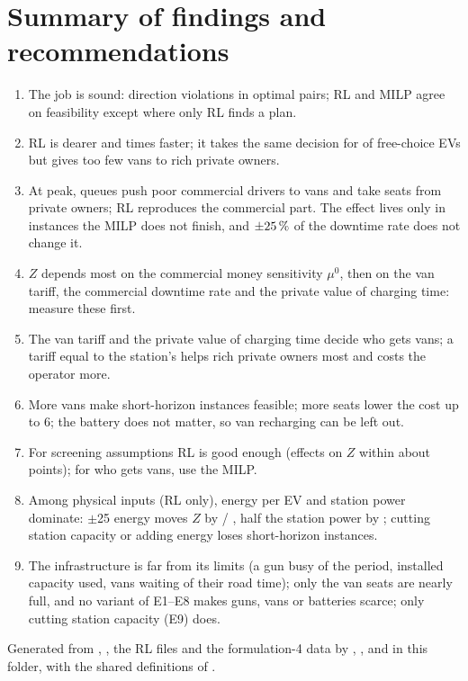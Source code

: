 \section{Summary of findings and recommendations}
\begin{enumerate}
  \item The job is sound: \DirBad{} direction violations in \DirPairs{} optimal pairs; RL and MILP agree on feasibility except where only RL finds a plan.
  \item RL is \GapMean\pct{} dearer and \SpeedUp{} times faster; it takes the same decision for \AgreeFree\pct{} of free-choice EVs but gives too few vans to rich private owners.
  \item At peak, queues push poor commercial drivers to vans and take seats from private owners; RL reproduces the commercial part. The effect lives only in instances the MILP does not finish, and $\pm25\,\%$ of the downtime rate does not change it.
  \item $Z$ depends most on the commercial money sensitivity $\mu^0$, then on the van tariff, the commercial downtime rate and the private value of charging time: measure these first.
  \item The van tariff and the private value of charging time decide who gets vans; a tariff equal to the station's helps rich private owners most and costs the operator more.
  \item More vans make short-horizon instances feasible; more seats lower the cost up to 6; the battery does not matter, so van recharging can be left out.
  \item For screening assumptions RL is good enough (effects on $Z$ within about \EffDiffRtMean{} points); for who gets vans, use the MILP.
  \item Among physical inputs (RL only), energy per EV and station power dominate: $\pm$25\pct{} energy moves $Z$ by \dZEtenDemLoRt\pct{} / \dZEtenDemHiRt\pct, half the station power by \dZEninePowLoRt\pct; cutting station capacity or adding energy loses short-horizon instances.
  \item The infrastructure is far from its limits (a gun busy \UGunMilp\pct{} of the period, installed capacity \USystemMilp\pct{} used, vans waiting \UIdleVanMilp\pct{} of their road time); only the van seats are nearly full, and no variant of E1--E8 makes guns, vans or batteries scarce; only cutting station capacity (E9) does.
\end{enumerate}

\vspace{6pt}
{\footnotesize Generated from , , the RL  files and the formulation-4 data by , ,  and  in this folder, with the shared definitions of .}


